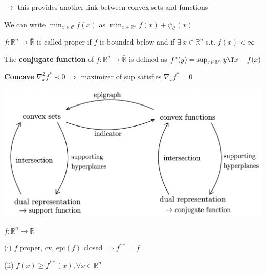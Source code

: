 $\rightarrow$ this provides another link between convex sets and functions

We can write
$\min_{x \in \mathcal{C}}f(x)$ as
$\min_{x \in \mathbb{R}^{n}}f(x) + \psi_\mathcal{C}(x)$

\begin{definition}[3]
	$f: \mathbb{R}^{n}\rightarrow\bar{\mathbb{R}}$ is called proper
	if $f$ is bounded below and
	if $\exists\ x \in \mathbb{R}^{n}$ s.t. $f(x)<\infty$
\end{definition}

\begin{definition}
	The \textbf{conjugate function} of $f: \mathbb{R}^{n}\rightarrow\bar{\mathbb{R}}$  is defined as
	$f^*(y)=\sup_{x \in \mathbb{R}^{n}}y\T x-f(x)$
\end{definition}

\textbf{Concave}
$\nabla_x^2 f^* \prec0$
$\Rightarrow$
maximizer of sup satisfies
$\nabla_x f^* = 0$

\includegraphics[width=\columnwidth]{images/summary_set_functions.png}

\begin{theorem}
	$f:\mathbb{R}^{n}\rightarrow\bar{\mathbb{R}}$

	(i) $f$ proper, cv, epi$(f)$ closed
	$\Rightarrow f^{**}=f$

	(ii) $f(x)\ge f^{**}(x), \forall x\in\mathbb{R}^{n}$
\end{theorem}
